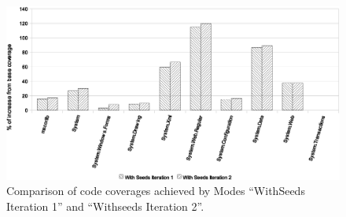 \begin{figure}[t]
\centering
\includegraphics[scale=0.70,clip]{figs/RQ3_2_1.eps}\vspace*{-1ex}
\caption{\label{fig:rq32}Comparison of code coverages achieved by Modes ``WithSeeds Iteration 1'' and ``Withseeds Iteration 2''.}
\end{figure}


